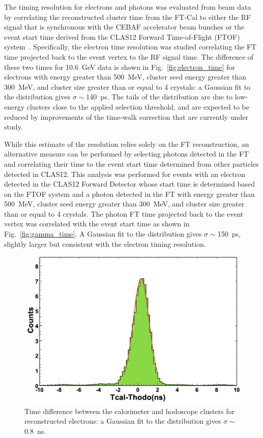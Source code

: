 The timing resolution for electrons and photons was evaluated from beam data by correlating the reconstructed
cluster time from the FT-Cal to either the RF signal that is synchronous with the CEBAF accelerator beam bunches
or the event start time derived from the CLAS12 Forward Time-of-Flight (FTOF) system~\cite{ftof}.
Specifically, the electron time resolution was studied correlating the FT time projected back to the event vertex
to the RF signal time. The difference of these two times for 10.6~GeV data is shown in Fig.~\ref{fig:electron_time}
for electrons with energy greater than 500~MeV, cluster seed energy greater than 300~MeV, and cluster size
greater than or equal to 4 crystals: a Gaussian fit to the distribution gives $\sigma \sim$140~ps. The tails of the
distribution are due to low-energy clusters close to the applied selection threshold, and are expected to be reduced
by improvements of the time-walk correction that are currently under study.

While this estimate of the resolution relies solely on the FT reconstruction, an alternative measure can be
performed by selecting photons detected in the FT and correlating their time to the event start time determined
from other particles detected in CLAS12. This analysis was performed for events with an electron detected in
the CLAS12 Forward Detector whose start time is determined based on the FTOF system and a photon detected in
the FT with energy greater than 500~MeV, cluster seed energy greater than 300~MeV, and cluster size greater than
or equal to 4 crystals. The photon FT time projected back to the event vertex was correlated with the event start time as
shown in Fig.~\ref{fig:gamma_time}. A Gaussian fit to the distribution gives $\sigma \sim$150~ps, slightly
larger but consistent with the electron timing resolution.

\begin{figure}[h]
  \centering
\includegraphics[height=0.6\columnwidth]{fig/ftcalhodo_time.png}
\caption{Time difference between the calorimeter and hodoscope clusters for reconstructed electrons: a Gaussian fit
  to the distribution gives $\sigma \sim$0.8~ns.}
\label{fig:ftcalhodo_time}
\end{figure}

